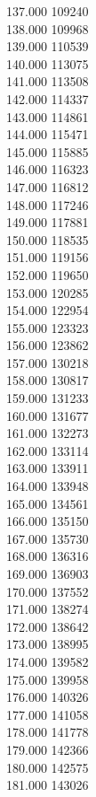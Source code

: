 { 137.000	109240 \\
 138.000	109968 \\
 139.000	110539 \\
 140.000	113075 \\
 141.000	113508 \\
 142.000	114337 \\
 143.000	114861 \\
 144.000	115471 \\
 145.000	115885 \\
 146.000	116323 \\
 147.000	116812 \\
 148.000	117246 \\
 149.000	117881 \\
 150.000	118535 \\
 151.000	119156 \\
 152.000	119650 \\
 153.000	120285 \\
 154.000	122954 \\
 155.000	123323 \\
 156.000	123862 \\
 157.000	130218 \\
 158.000	130817 \\
 159.000	131233 \\
 160.000	131677 \\
 161.000	132273 \\
 162.000	133114 \\
 163.000	133911 \\
 164.000	133948 \\
 165.000	134561 \\
 166.000	135150 \\
 167.000	135730 \\
 168.000	136316 \\
 169.000	136903 \\
 170.000	137552 \\
 171.000	138274 \\
 172.000	138642 \\
 173.000	138995 \\
 174.000	139582 \\
 175.000	139958 \\
 176.000	140326 \\
 177.000	141058 \\
 178.000	141778 \\
 179.000	142366 \\
 180.000	142575 \\
 181.000	143026 \\
}
